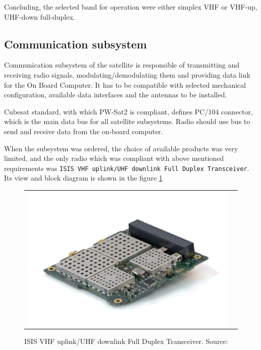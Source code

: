Concluding, the selected band for operation were either simplex VHF or VHF-up, UHF-down full-duplex.

\subsection{Communication subsystem}
Communication subsystem of the satellite is responsible of transmitting and receiving radio signals, modulating/demodulating them and providing data link for the On Board Computer. It has to be compatible with selected mechanical configuration, available data interfaces and the antennas to be installed.

Cubesat standard, with which PW-Sat2 is compliant, defines PC/104 connector, which is the main data bus for all satellite subsystems. Radio should use \iic bus to send and receive data from the on-board computer.

When the subsystem was ordered, the choice of available products was very limited, and the only radio which was compliant with above mentioned requirements was \texttt{ISIS VHF uplink/UHF downlink Full Duplex Transceiver}. Its view and block diagram is shown in the figure \ref{ISIS_TRXvU}

\begin{figure}
   \centering
\begin{tabular}{cc}
        \includegraphics[width=0.4\paperwidth]{img/2/ISIS-radio-UHF-VHF-min.png}
    & 
\end{tabular}
\label{ISIS_TRXvU}
\caption{ISIS VHF uplink/UHF downlink Full Duplex Transceiver. Source: \cite{???}}
\end{figure}

